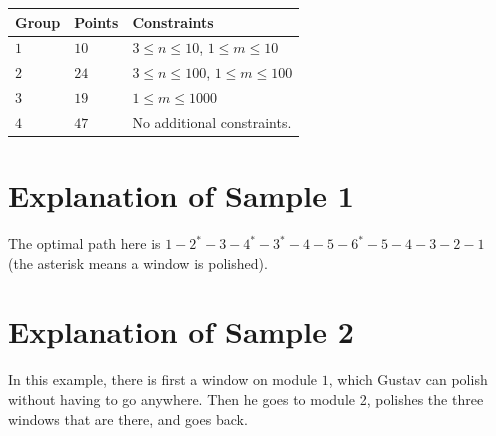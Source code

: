 \noindent
\begin{tabular}{| l | l | p{12cm} |}
  \hline
  \textbf{Group} & \textbf{Points} & \textbf{Constraints} \\ \hline
  $1$    & $10$      & $3 \le n \le 10$, $1 \le m \le 10$ \\ \hline
  $2$    & $24$      & $3 \le n \le 100$, $1 \le m \le 100$ \\ \hline
  $3$    & $19$      & $1 \le m \le 1000$  \\ \hline
  $4$    & $47$      & No additional constraints. \\ \hline
\end{tabular}

\section*{Explanation of Sample 1}
The optimal path here is $1-2^*-3-4^*-3^*-4-5-6^*-5-4-3-2-1$ (the asterisk means a window is polished).
\section*{Explanation of Sample 2}
In this example, there is first a window on module $1$, which Gustav can polish without having to go anywhere. Then he goes to module 2,
polishes the three windows that are there, and goes back.
